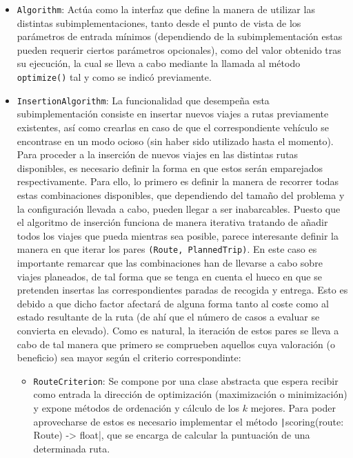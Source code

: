 \documentclass{subfiles}
\begin{document}
          \begin{itemize}

              \item \texttt{Algorithm}: Actúa como la interfaz que define la manera de utilizar las distintas subimplementaciones, tanto desde el punto de vista de los parámetros de entrada mínimos (dependiendo de la subimplementación estas pueden requerir ciertos parámetros opcionales), como del valor obtenido tras su ejecución, la cual se lleva a cabo mediante la llamada al método \texttt{optimize()} tal y como se indicó previamente.

              \item \texttt{InsertionAlgorithm}: La funcionalidad que desempeña esta subimplementación consiste en insertar nuevos viajes a rutas previamente existentes, así como crearlas en caso de que el correspondiente vehículo se encontrase en un modo ocioso (sin haber sido utilizado hasta el momento). Para proceder a la inserción de nuevos viajes en las distintas rutas disponibles, es necesario definir la forma en que estos serán emparejados respectivamente. Para ello, lo primero es definir la manera de recorrer todas estas combinaciones disponibles, que dependiendo del tamaño del problema y la configuración llevada a cabo, pueden llegar a ser inabarcables. Puesto que el algoritmo de inserción funciona de manera iterativa tratando de añadir todos los viajes que pueda mientras sea posible, parece interesante definir la manera en que iterar los pares \texttt{(Route, PlannedTrip)}. En este caso es importante remarcar que las combinaciones han de llevarse a cabo sobre viajes planeados, de tal forma que se tenga en cuenta el hueco en que se pretenden insertas las correspondientes paradas de recogida y entrega. Esto es debido a que dicho factor afectará de alguna forma tanto al coste como al estado resultante de la ruta (de ahí que el número de casos a evaluar se convierta en elevado). Como es natural, la iteración de estos pares se lleva a cabo de tal manera que primero se comprueben aquellos cuya valoración (o beneficio) sea mayor según el criterio correspondinte:

                  \begin{itemize}

                      \item \texttt{RouteCriterion}: Se compone por una clase abstracta que espera recibir como entrada la dirección de optimización (maximización o minimización) y expone métodos de ordenación y cálculo de los $k$ mejores. Para poder aprovecharse de estos es necesario implementar el método \texttt|scoring(route: Route) -> float|, que se encarga de calcular la puntuación de una determinada ruta.


\end{itemize}
\end{itemize}
\end{document}
